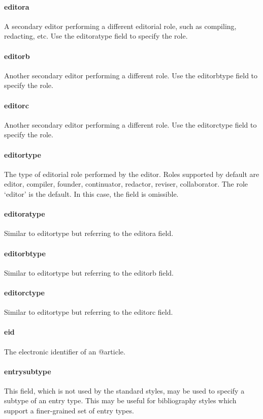 \documentclass[a4paper,12pt]{report}
\begin{document}
\paragraph{editora}
A secondary editor performing a different editorial role, such as compiling, redacting, etc.
Use the editoratype field to specify the role.

\paragraph{editorb}
Another secondary editor performing a different role. Use the editorbtype field to specify
the role.

\paragraph{editorc}
Another secondary editor performing a different role. Use the editorctype field to specify
the role.

\paragraph{editortype}
The type of editorial role performed by the editor. Roles supported by default are editor,
compiler, founder, continuator, redactor, reviser, collaborator. The role ‘editor’ is
the default. In this case, the field is omissible.

\paragraph{editoratype}
Similar to editortype but referring to the editora field.

\paragraph{editorbtype}
Similar to editortype but referring to the editorb field.

\paragraph{editorctype}
Similar to editortype but referring to the editorc field.

\paragraph{eid}
The electronic identifier of an @article.

\paragraph{entrysubtype}
This field, which is not used by the standard styles, may be used to specify a subtype of an
entry type. This may be useful for bibliography styles which support a finer-grained set of
entry types.
\end{document}
